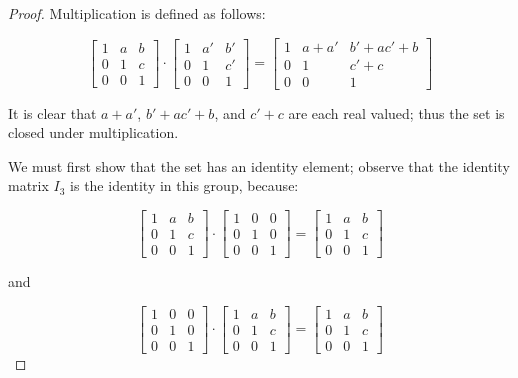\documentclass{article}
\begin{document}
\begin{proof}

Multiplication is defined as follows:

\[
\begin{bmatrix}
    1 & a & b \\
    0 & 1 & c \\
    0 & 0 & 1
    \end{bmatrix}
    \cdot
    \begin{bmatrix}
    1 & a' & b' \\
    0 & 1 & c' \\
    0 & 0 & 1
    \end{bmatrix}
    =
    \begin{bmatrix}
    1 & a + a' & b' + ac' + b \\
    0 & 1 & c' + c \\
    0 & 0 & 1
    \end{bmatrix}
\]

It is clear that $a+a'$, $b'+ac'+b$, and $c'+c$ are each real valued; thus the set is closed under multiplication. 

We must first show that the set has an identity element; observe that the identity matrix $I_3$ is the identity in this group, because:

\[
\begin{bmatrix}
    1 & a & b \\
    0 & 1 & c \\
    0 & 0 & 1
    \end{bmatrix}
    \cdot
    \begin{bmatrix}
    1 & 0 & 0 \\
    0 & 1 & 0 \\
    0 & 0 & 1
    \end{bmatrix}
    =
    \begin{bmatrix}
    1 & a & b \\
    0 & 1 & c \\
    0 & 0 & 1
    \end{bmatrix}
\]

and

\[
\begin{bmatrix}
    1 & 0 & 0 \\
    0 & 1 & 0 \\
    0 & 0 & 1
    \end{bmatrix}
    \cdot
    \begin{bmatrix}
    1 & a & b \\
    0 & 1 & c \\
    0 & 0 & 1
    \end{bmatrix}
    =
    \begin{bmatrix}
    1 & a & b \\
    0 & 1 & c \\
    0 & 0 & 1
    \end{bmatrix}
\]


\end{proof}
\end{document}
